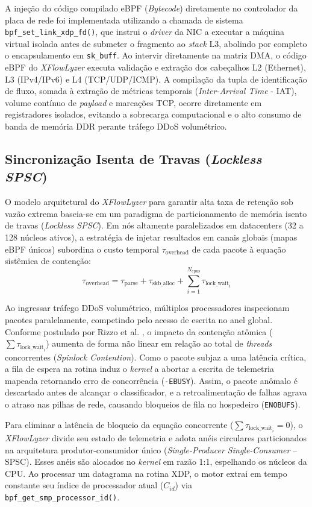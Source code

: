 \documentclass[conference]{IEEEtran}
\newcommand{\nome}{\textit{XFlowLyzer}\xspace}
\begin{document}
A injeção do código compilado eBPF (\textit{Bytecode}) diretamente no controlador da placa de rede foi implementada utilizando a chamada de sistema \texttt{bpf\_set\_link\_xdp\_fd()}, que instrui o \textit{driver} da NIC a executar a máquina virtual isolada antes de submeter o fragmento ao \textit{stack} L3, abolindo por completo o encapsulamento em \texttt{sk\_buff}. Ao intervir diretamente na matriz DMA, o código eBPF do \nome executa validação e extração dos cabeçalhos L2 (Ethernet), L3 (IPv4/IPv6) e L4 (TCP/UDP/ICMP). A compilação da tupla de identificação de fluxo, somada à extração de métricas temporais (\textit{Inter-Arrival Time} - IAT), volume contínuo de \textit{payload} e marcações TCP, ocorre diretamente em registradores isolados, evitando a sobrecarga computacional e o alto consumo de banda de memória DDR perante tráfego DDoS volumétrico.

\subsection{Sincronização Isenta de Travas (\textit{Lockless SPSC})}
O modelo arquitetural do \nome para garantir alta taxa de retenção sob vazão extrema baseia-se em um paradigma de particionamento de memória isento de travas (\textit{Lockless SPSC}).
Em nós altamente paralelizados em datacenters (32 a 128 núcleos ativos), a estratégia de injetar resultados em canais globais (mapas eBPF únicos) subordina o custo temporal $\tau_{\text{overhead}}$ de cada pacote à equação sistêmica de contenção:
\[
\tau_{\text{overhead}} = \tau_{\text{parse}} + \tau_{\text{skb\_alloc}} + \sum_{i=1}^{N_{\text{cpus}}} \tau_{\text{lock\_wait}_i}
\]

Ao ingressar tráfego DDoS volumétrico, múltiplos processadores inspecionam pacotes paralelamente, competindo pelo acesso de escrita no anel global. Conforme postulado por Rizzo et al. \cite{ref_2018_pspat}, o impacto da contenção atômica ($\sum \tau_{\text{lock\_wait}_i}$) aumenta de forma não linear em relação ao total de \textit{threads} concorrentes (\textit{Spinlock Contention}). Como o pacote subjaz a uma latência crítica, a fila de espera na rotina induz o \textit{kernel} a abortar a escrita de telemetria mapeada retornando erro de concorrência (\texttt{-EBUSY}). Assim, o pacote anômalo é descartado antes de alcançar o classificador, e a retroalimentação de falhas agrava o atraso nas pilhas de rede, causando bloqueios de fila no hospedeiro (\texttt{ENOBUFS}).

Para eliminar a latência de bloqueio da equação concorrente ($\sum \tau_{\text{lock\_wait}_i} = 0$), o \nome divide seu estado de telemetria e adota anéis circulares particionados na arquitetura produtor-consumidor único (\textit{Single-Producer Single-Consumer} -- SPSC). Esses anéis são alocados no \textit{kernel} em razão 1:1, espelhando os núcleos da CPU. Ao processar um datagrama na rotina XDP, o motor extrai em tempo constante seu índice de processador atual ($C_{id}$) via \texttt{bpf\_get\_smp\_processor\_id()}. 
\end{document}
